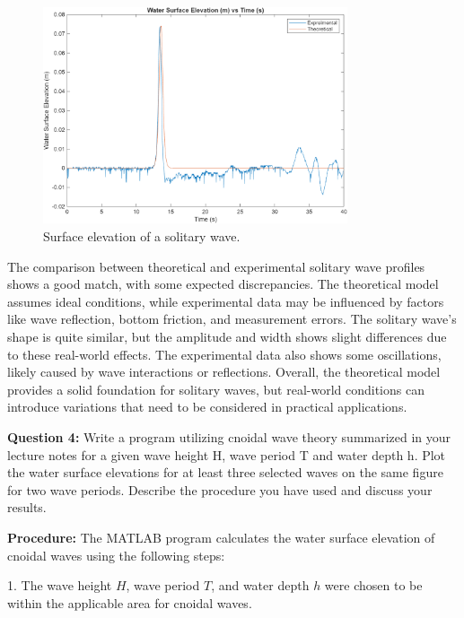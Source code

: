 \documentclass[a4paper]{article}
\begin{document}
\begin{figure}[H]
    \centering
    \includegraphics[width=0.8\textwidth]{CE591HW1-Q3.png}
    \caption{\small Surface elevation of a solitary wave.}
    \label{fig:plot3}
\end{figure} 
\vspace{0.3cm}

The comparison between theoretical and experimental solitary wave profiles shows a good match, with some expected discrepancies. The theoretical model assumes ideal conditions, while experimental data may be influenced by factors like wave reflection, bottom friction, and measurement errors. The solitary wave's shape is quite similar, but the amplitude and width shows slight differences due to these real-world effects. The experimental data also shows some oscillations, likely caused by wave interactions or reflections. Overall, the theoretical model provides a solid foundation for solitary waves, but real-world conditions can introduce variations that need to be considered in practical applications.
\vspace{0.5cm}

\textbf{Question 4:} Write a program utilizing cnoidal wave theory summarized in your lecture notes for a given wave height H, wave period T and water depth h. Plot the water surface elevations for at least three selected waves on the same figure for two wave periods. Describe the procedure you have used and discuss your results.
\vspace{0.3cm}

\textbf{Procedure:} The MATLAB program calculates the water surface elevation of cnoidal waves using the following steps:

1. The wave height \(H\), wave period \(T\), and water depth \(h\) were chosen to be within the applicable area for cnoidal waves.
\end{document}
